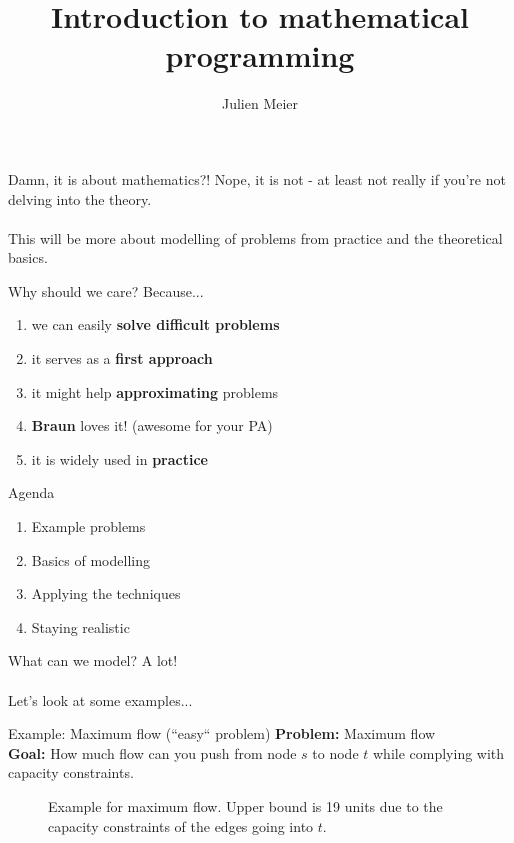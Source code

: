 \documentclass[10pt]{beamer}
\title{Introduction to mathematical programming}
\author{Julien Meier}
\newcommand{\primaryColorB}[1]{\textcolor{mpigreen}{\textbf{#1}}}
\newcommand{\q}[1]{``#1``}
\begin{document}
\maketitle

\begin{frame}{Damn, it is about mathematics?!}
Nope, it is not - at least not really if you're not delving into the theory.\\\,\\


This will be more about modelling of problems from practice and the theoretical basics.
\end{frame}


\begin{frame}{Why should we care?}
Because...
\begin{enumerate}
	\item we can easily \primaryColorB{solve difficult problems}
	\item it serves as a \primaryColorB{first approach}
	\item it might help \primaryColorB{approximating} problems
	\item \primaryColorB{Braun} loves it! (awesome for your PA)
	\item it is widely used in \primaryColorB{practice}
\end{enumerate}
\end{frame}


\begin{frame}{Agenda}
\begin{enumerate}
	\item Example problems
	\item Basics of modelling
	\item Applying the techniques
	\item Staying realistic
\end{enumerate}
\end{frame}

\begin{frame}{What can we model?}
A lot!\\\,\\

Let's look at some examples...
\end{frame}



\begin{frame}{Example: Maximum flow (\q{easy} problem)}
\primaryColorB{Problem:} Maximum flow\\
\primaryColorB{Goal:} How much flow can you push from node $s$ to node $t$ while complying with capacity constraints.\\

\begin{figure}
	\centering
	\scalebox{1.4}{\maxFlow}
	\caption{Example for maximum flow. Upper bound is 19 units due to the capacity constraints of the edges going into $t$.}
\end{figure}
\end{frame}
\end{document}
